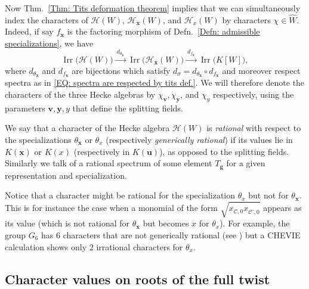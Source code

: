 \documentclass[ALCO, Unicode]{cedram}
\newcommand{\op}[1]{\operatorname{#1}}
\newcommand{\op}[1]{\operatorname{#1}}
\begin{document}
Now Thm.~\ref{Thm: Tits deformation theorem} implies that we can simultaneously index the characters of $\mathcal{H}(W)$, $\mathcal{H}_{\bm x}(W)$, and $\mathcal{H}_x(W)$ by characters $\chi\in\widehat{W}$. Indeed, if say $f_{\bm x}$ is the factoring morphism of Defn.~\ref{Defn: admissible specializations}, we have \begin{equation}\op{Irr}\big(\mathcal{H}(W)\big)\xrightarrow{\displaystyle \ d_{\theta_{\bm x}}\ }\op{Irr}\big(\mathcal{H}_{\bm x}(W)\big)\xrightarrow{\displaystyle \ d_{f_{\bm x}}\ }\op{Irr}\big(K[W]\big),\label{EQ: admissible specializations and Tits factoring}\end{equation} where $d_{\theta_{\bm x}}$ and $d_{f_{\bm x}}$ are bijections which satisfy $d_{\sigma}=d_{\theta_{\bm x}}\circ d_{f_{\bm x}}$ and moreover respect spectra as in \eqref{EQ: spectra are respected by tits def.}. We will therefore denote the characters of the three Hecke algebras by $\chi_{\bm v}, \chi_{\bm y}$, and $\chi_y$ respectively, using the parameters $\bm v,\bm y,y$ that define the splitting fields.

\begin{defi}\label{Defn: rational character}
We say that a character of the Hecke algebra $\mathcal{H}(W)$ is \emph{rational} with respect to the specializations $\theta_{\bm x}$ or $\theta_x$ \textup{(}respectively \emph{generically rational}\textup{)} if its values lie in $K(\bm x)$ or $K(x)$ \textup{(}respectively in $K(\bm u)$\textup{)}, as opposed to the splitting fields. Similarly we talk of a rational spectrum of some element $T_{\bm g}$ for a given representation and specialization.
\end{defi}

\begin{rema}
Notice that a character might be rational for the specialization $\theta_x$ but not for $\theta_{\bm x}$. This is for instance the case when a monomial of the form $\sqrt{x^{\phantom{N_W}}_{\mathcal{C},0}x^{\phantom{N_W}}_{\mathcal{C'},0}}$ appears as its value (which is not rational for $\theta_{\bm x}$ but becomes $x$ for $\theta_x$). For example, the group $G_6$ has $6$ characters that are not generically rational (see \cite[Table~8.1]{malle-fake-degrees}) but a CHEVIE \cite{chevie-all,chevie-michel} calculation shows only $2$ irrational characters for $\theta_x$.
\end{rema}


\subsection{Character values on roots of the full twist}
\label{Section: Character values on roots of the full twist}
\end{document}
